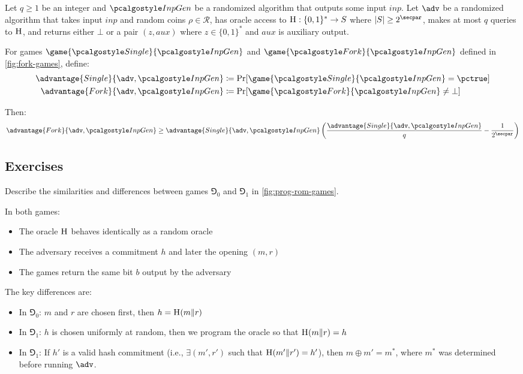 \begin{lemma}\label{lem:fork}
  Let $q \geq 1$ be an integer and $\algo{InpGen}$ be a randomized algorithm that outputs some input $\mathit{inp}$.
  Let $\adv$ be a randomized algorithm that takes input $\mathit{inp}$ and random coins $\rho \in \mathcal{R}$, has oracle access to ${\normalfont\textsc{H}}: \{0,1\}^* \rightarrow S$ where $|S| \geq 2^\secpar$, makes at most $q$ queries to ${\normalfont\textsc{H}}$, and returns either $\bot$ or a pair $(z, \mathit{aux})$ where $z \in \{0,1\}^*$ and $\mathit{aux}$ is auxiliary output.
  
  For games $\game{\algo{Single}}{\algo{InpGen}}$ and $\game{\algo{Fork}}{\algo{InpGen}}$ defined in \autoref{fig:fork-games}, define:
  \begin{align*}
    \advantage{Single}{\adv, \algo{InpGen}} &\defeq \Pr[\game{\algo{Single}}{\algo{InpGen}} = \pctrue] \\
    \advantage{Fork}{\adv, \algo{InpGen}} &\defeq \Pr[\game{\algo{Fork}}{\algo{InpGen}} \neq \bot]
  \end{align*}
  
  Then:
  \[
  \advantage{Fork}{\adv, \algo{InpGen}} \geq \advantage{Single}{\adv, \algo{InpGen}} \left( \frac{\advantage{Single}{\adv, \algo{InpGen}}}{q} - \frac{1}{2^\secpar} \right)
  \]
\end{lemma}

\subsection{Exercises}

\begin{exercise}
  Describe the similarities and differences between games $\Game_0$ and $\Game_1$ in \autoref{fig:prog-rom-games}.
\end{exercise}

\ifsolutions
\begin{mysolution}
  In both games:
  \begin{itemize}
    \item The oracle ${\normalfont\textsc{H}}$ behaves identically as a random oracle
    \item The adversary receives a commitment $h$ and later the opening $(m, r)$
    \item The games return the same bit $b$ output by the adversary
  \end{itemize}
  
  The key differences are:
  \begin{itemize}
    \item In $\Game_0$: $m$ and $r$ are chosen first, then $h = {\normalfont\textsc{H}}(m \| r)$
    \item In $\Game_1$: $h$ is chosen uniformly at random, then we program the oracle so that ${\normalfont\textsc{H}}(m \| r) = h$
    \item In $\Game_1$: If $h'$ is a valid hash commitment (i.e., $\exists (m', r')$ such that ${\normalfont\textsc{H}}(m' \| r') = h'$), then $m \oplus m' = m^*$, where $m^*$ was determined before running $\adv$.
  \end{itemize}
\end{mysolution}
\fi

